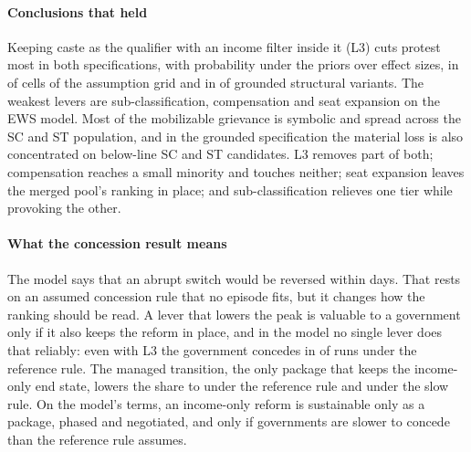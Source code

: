 \documentclass[11pt,a4paper]{article}
\begin{document}
\paragraph{Conclusions that held} Keeping caste as the qualifier with an income filter inside it (L3) cuts protest most in both specifications, with probability \MapGroundedStrongestLThree{} under the priors over effect sizes, in \AssumptionLThreeFirst{} of \AssumptionCells{} cells of the assumption grid and in \GEnsembleLThreeStrongest{} of \GEnsembleVariants{} grounded structural variants. The weakest levers are sub-classification, compensation and seat expansion on the EWS model. Most of the mobilizable grievance is symbolic and spread across the SC and ST population, and in the grounded specification the material loss is also concentrated on below-line SC and ST candidates. L3 removes part of both; compensation reaches a small minority and touches neither; seat expansion leaves the merged pool's ranking in place; and sub-classification relieves one tier while provoking the other.

\paragraph{What the concession result means} The model says that an abrupt switch would be reversed within days. That rests on an assumed concession rule that no episode fits, but it changes how the ranking should be read. A lever that lowers the peak is valuable to a government only if it also keeps the reform in place, and in the model no single lever does that reliably: even with L3 the government concedes in \ConcessionReferenceShareLThree{} of runs under the reference rule. The managed transition, the only package that keeps the income-only end state, lowers the share to \ConcessionReferenceShareCOne{} under the reference rule and \ConcessionSlowShareCOne{} under the slow rule. On the model's terms, an income-only reform is sustainable only as a package, phased and negotiated, and only if governments are slower to concede than the reference rule assumes.
\end{document}
